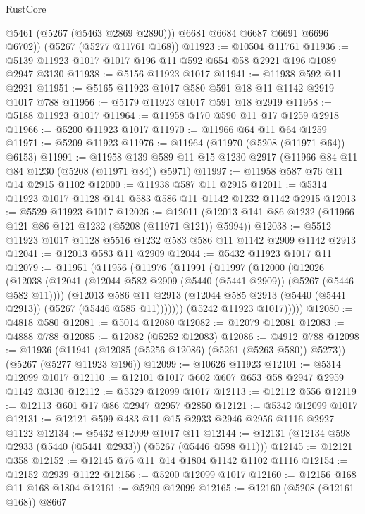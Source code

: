 \begin{lexlean}{RustCore}
\begin{coremodule}
          @5461
          (@5267 (@5463 @2869 @2890)))
        @6681
        @6684
        @6687
        @6691
        @6696
        @6702))
    (@5267 (@5277 @11761 @168))
@11923 := @10504 @11761
@11936 := @5139 @11923 @1017 @1017 @196 @11 @592 @654 @58 @2921 @196 @1089 @2947 @3130
@11938 := @5156 @11923 @1017
@11941 := @11938 @592 @11 @2921
@11951 := @5165 @11923 @1017 @580 @591 @18 @11 @1142 @2919 @1017 @788
@11956 := @5179 @11923 @1017 @591 @18 @2919
@11958 := @5188 @11923 @1017
@11964 := @11958 @170 @590 @11 @17 @1259 @2918
@11966 := @5200 @11923 @1017
@11970 := @11966 @64 @11 @64 @1259
@11971 := @5209 @11923
@11976 := @11964 (@11970 (@5208 (@11971 @64)) @6153)
@11991 := @11958 @139 @589 @11 @15 @1230 @2917 (@11966 @84 @11 @84 @1230 (@5208 (@11971 @84)) @5971)
@11997 := @11958 @587 @76 @11 @14 @2915 @1102
@12000 := @11938 @587 @11 @2915
@12011 := @5314 @11923 @1017 @1128 @141 @583 @586 @11 @1142 @1232 @1142 @2915
@12013 := @5529 @11923 @1017
@12026 := @12011 (@12013 @141 @86 @1232 (@11966 @121 @86 @121 @1232 (@5208 (@11971 @121)) @5994))
@12038 := @5512 @11923 @1017 @1128 @5516 @1232 @583 @586 @11 @1142 @2909 @1142 @2913
@12041 := @12013 @583 @11 @2909
@12044 := @5432 @11923 @1017 @11
@12079 := @11951
    (@11956
      (@11976
        (@11991
          (@11997
            (@12000
              (@12026
                (@12038
                  (@12041 (@12044 @582 @2909 (@5440 (@5441 @2909)) (@5267 (@5446 @582 @11))))
                  (@12013
                    @586
                    @11
                    @2913
                    (@12044 @585 @2913 (@5440 (@5441 @2913)) (@5267 (@5446 @585 @11)))))))
            (@5242 @11923 @1017)))))
@12080 := @4818 @580
@12081 := @5014 @12080
@12082 := @12079 @12081
@12083 := @4888 @788
@12085 := @12082 (@5252 @12083)
@12086 := @4912 @788
@12098 := @11936
    (@11941 (@12085 (@5256 @12086) (@5261 (@5263 @580)) @5273))
    (@5267 (@5277 @11923 @196))
@12099 := @10626 @11923
@12101 := @5314 @12099 @1017
@12110 := @12101 @1017 @602 @607 @653 @58 @2947 @2959 @1142 @3130
@12112 := @5329 @12099 @1017
@12113 := @12112 @556
@12119 := @12113 @601 @17 @86 @2947 @2957 @2850
@12121 := @5342 @12099 @1017
@12131 := @12121 @599 @483 @11 @15 @2933 @2946 @2956 @1116 @2927 @1122
@12134 := @5432 @12099 @1017 @11
@12144 := @12131 (@12134 @598 @2933 (@5440 (@5441 @2933)) (@5267 (@5446 @598 @11)))
@12145 := @12121 @358
@12152 := @12145 @76 @11 @14 @1804 @1142 @1102 @1116
@12154 := @12152 @2939 @1122
@12156 := @5200 @12099 @1017
@12160 := @12156 @168 @11 @168 @1804
@12161 := @5209 @12099
@12165 := @12160 (@5208 (@12161 @168)) @8667

\end{coremodule}
\end{lexlean}
